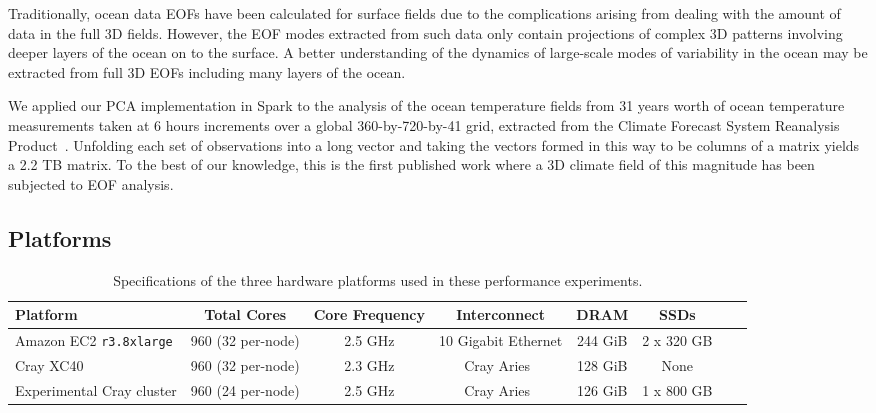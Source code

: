 Traditionally, ocean data EOFs have been calculated for surface fields due to
the complications arising from dealing with the amount of data in the full 3D fields. 
However, the EOF modes extracted from such data only
contain projections of complex 3D patterns involving deeper layers of the
ocean on to the surface. A better understanding of the dynamics of large-scale
modes of variability in the ocean may be extracted from full 3D EOFs including
many layers of the ocean. 

We applied our PCA implementation in Spark to the analysis of the ocean
temperature fields from 31 years worth of ocean temperature measurements taken
at 6 hours increments over a global 360-by-720-by-41 grid, extracted
from the Climate Forecast System Reanalysis Product~\cite{Saha:2010ji}.
Unfolding each set of observations into a long vector and taking the vectors
formed in this way to be columns of a matrix yields a 2.2 TB matrix.
To the best of our knowledge, this is the first published work where a 3D
climate field of this magnitude has been subjected to EOF analysis.

\subsection{Platforms}

  \begin{table*}
    \begin{center}
    \begin{tabular}{| l | c | c | c | c | c | c | c |}
    \toprule
    \textbf{Platform} & \textbf{Total Cores} & \textbf{Core Frequency} & \textbf{Interconnect} & \textbf{DRAM} & \textbf{SSDs} \\
    \midrule
    Amazon EC2 \texttt{r3.8xlarge} & 960 (32 per-node) & 2.5 GHz & 10 Gigabit Ethernet & 244 GiB & 2 x 320 GB \\
    \midrule
    Cray XC40 & 960 (32 per-node) & 2.3 GHz & Cray Aries~\cite{alverson2012cray,craycascadesc12} & 128 GiB & None \\
    \midrule
    Experimental Cray cluster & 960 (24 per-node) & 2.5 GHz & Cray Aries~\cite{alverson2012cray,craycascadesc12} & 126 GiB & 1 x 800 GB \\
    \bottomrule
    \end{tabular}
    \end{center}
    \caption{Specifications of the three hardware platforms used in these performance experiments.}
    \label{tab:hwspecs}
  \end{table*}

